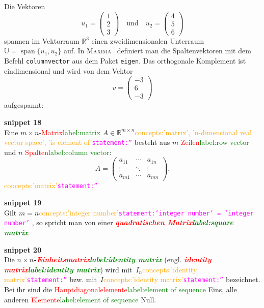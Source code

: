 \documentclass[a4paper,twoside,english,ngerman,deutsch,german,sectrefs,envcountsame,envcountchap]{svmono}
\newcommand{\setref}[2]{\textcolor{red}{#1}\textcolor{green}{#2}}
\newcommand{\snippet}[1]{\textbf{snippet #1}\\}
\newcommand{\eqnote}[2]{\textcolor{orange}{#1}\textcolor{magenta}{\texttt{#2}}}
\begin{document}
\begin{example}
\label{exa:orthogonales-Komplement}Die Vektoren
\[
u_{1}=\left(\begin{array}{c} 1\\ 2\\ 3
\end{array}\right)\quad\text{und}\quad u_{2}=\left(\begin{array}{c}
4\\ 5\\ 6
\end{array}\right)
\]
spannen im Vektorraum ${\mathbb{R}}^{3}$ einen zweidimensionalen Unterraum $\mathbb{U}={\operatorname{span}}\{u_{1},u_{2}\}$ auf. In \textsc{Maxima}~\cite{maxima,haager2014} definiert man die Spaltenvektoren mit dem Befehl \texttt{columnvector} aus dem Paket \texttt{eigen}. Das orthogonale Komplement ist eindimensional und wird von dem Vektor
\[
v=\left(\begin{array}{c} -3\\ 6\\ -3
\end{array}\right)
\]
aufgespannt:


\end{example}


\snippet{18}
Eine $m\times n$-\setref{Matrix}{label:matrix} $A\in{\mathbb{R}}^{m\times n}$\eqnote{concepts:'matrix', 'n-dimensional real vector space', 'is element of'}{statement:''} besteht aus $m$ \setref{Zeilen}{label:row vector} und $n$ \setref{Spalten}{label:column vector}:
\[
A=\left(\begin{array}{ccc} a_{11} & \cdots & a_{1n}\\
\vdots & \ddots & \vdots\\
a_{m1} & \cdots & a_{mn}
\end{array}\right).
\]\eqnote{concepts:'matrix'}{statement:''}

\snippet{19}
Gilt $m=n$\eqnote{concepts:'integer number'}{statement:'integer number' = 'integer number'} , so spricht man von einer \textbf{\em \setref{quadratischen Matrix}{label:square matrix}}.

\snippet{20}
Die $n\times n$\textbf{\em -\setref{Einheitsmatrix}{label:identity matrix}} (engl. \textbf{\em \setref{identity matrix}{label:identity matrix}}) wird mit~$I_{n}$\eqnote{concepts:'identity matrix'}{statement:''} bzw. mit~$I$\eqnote{concepts:'identity matrix'}{statement:''} bezeichnet. Bei ihr sind die \setref{Hauptdiagonalelemente}{label:element of sequence} Eins, alle anderen \setref{Elemente}{label:element of sequence} Null.
\end{document}
